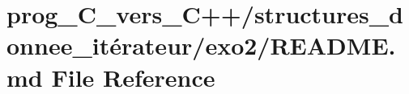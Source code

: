 \hypertarget{prog__C__vers__C_09_09_2structures__donnee__it_xC3_xA9rateur_2exo2_2README_8md}{}\section{prog\+\_\+\+C\+\_\+vers\+\_\+\+C++/structures\+\_\+donnee\+\_\+itérateur/exo2/\+R\+E\+A\+D\+ME.md File Reference}
\label{prog__C__vers__C_09_09_2structures__donnee__it_xC3_xA9rateur_2exo2_2README_8md}
